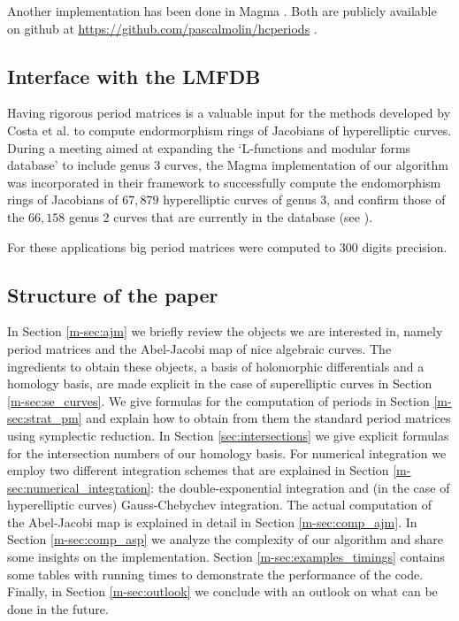 \documentclass[main.tex]{subfiles}
\begin{document}
  Another implementation has been done in Magma \cite{Magma}. Both are publicly available
  on github at \url{https://github.com/pascalmolin/hcperiods} \cite{githubhcperiods_2017_833727}.

  \subsection{Interface with the LMFDB}

  Having rigorous period matrices is a valuable input for the methods developed by
  Costa et al. \cite{CMSVEndos} to compute endormorphism rings of Jacobians of hyperelliptic
  curves.
  During a meeting aimed at expanding the `L-functions and modular forms database' \cite[LMFDB]{lmfdb}
  to include genus $3$ curves, the Magma implementation of our algorithm was incorporated in their framework
  to successfully compute the endomorphism rings of Jacobians of $67,879$ hyperelliptic
  curves of genus $3$, and confirm those of the $66,158$ genus
  2 curves that are currently in the database (see \cite[LMFDB]{Genus2LMFDB}).

  For these applications big period matrices were computed to $300$ digits precision.

  \subsection{Structure of the paper}

  In Section \ref{m-sec:ajm} we briefly review the objects we are interested
  in, namely period matrices and the Abel-Jacobi map of nice algebraic curves.
  The ingredients to obtain these objects, a basis of holomorphic differentials
  and a homology basis, are made explicit in the case of superelliptic curves
  in Section \ref{m-sec:se_curves}.
  We give formulas for the computation of periods in Section
  \ref{m-sec:strat_pm} and explain how to obtain from them the standard period
  matrices using symplectic reduction.
  In Section \ref{sec:intersections} we give explicit formulas for the
  intersection numbers of our homology basis.
  For numerical integration we employ two different integration schemes that
  are explained in Section \ref{m-sec:numerical_integration}: the
  double-exponential integration and
  (in the case of hyperelliptic curves) Gauss-Chebychev integration.
  The actual computation of the Abel-Jacobi map is explained in detail in
  Section \ref{m-sec:comp_ajm}.
  In Section \ref{m-sec:comp_asp} we analyze the complexity of our algorithm
  and share some insights on the implementation.
  Section \ref{m-sec:examples_timings} contains some tables with
  running times to demonstrate the performance of the code.
  Finally, in Section \ref{m-sec:outlook} we conclude with an outlook on what can be done in the future.
  
\end{document}
